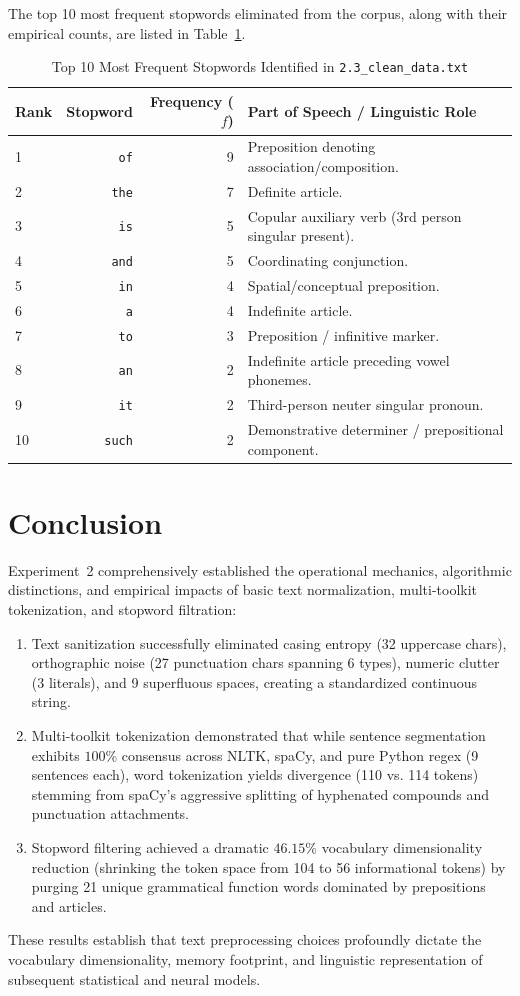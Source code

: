 The top 10 most frequent stopwords eliminated from the corpus, along with their empirical counts, are listed in Table~\ref{tab:exp2_top_stopwords}.
\begin{table}[H]
\centering
\small
\caption{Top 10 Most Frequent Stopwords Identified in \texttt{2.3\_clean\_data.txt}}
\label{tab:exp2_top_stopwords}
\begin{tabular}{lrrp{6.5cm}}
\toprule
\textbf{Rank} & \textbf{Stopword} & \textbf{Frequency ($f$)} & \textbf{Part of Speech / Linguistic Role} \\
\midrule
1 & \texttt{of} & 9 & Preposition denoting association/composition. \\
2 & \texttt{the} & 7 & Definite article. \\
3 & \texttt{is} & 5 & Copular auxiliary verb (3rd person singular present). \\
4 & \texttt{and} & 5 & Coordinating conjunction. \\
5 & \texttt{in} & 4 & Spatial/conceptual preposition. \\
6 & \texttt{a} & 4 & Indefinite article. \\
7 & \texttt{to} & 3 & Preposition / infinitive marker. \\
8 & \texttt{an} & 2 & Indefinite article preceding vowel phonemes. \\
9 & \texttt{it} & 2 & Third-person neuter singular pronoun. \\
10 & \texttt{such} & 2 & Demonstrative determiner / prepositional component. \\
\bottomrule
\end{tabular}
\end{table}

\section{Conclusion}
Experiment~2 comprehensively established the operational mechanics, algorithmic distinctions, and empirical impacts of basic text normalization, multi-toolkit tokenization, and stopword filtration:
\begin{enumerate}
    \item Text sanitization successfully eliminated casing entropy (32 uppercase chars), orthographic noise (27 punctuation chars spanning 6 types), numeric clutter (3 literals), and 9 superfluous spaces, creating a standardized continuous string.
    \item Multi-toolkit tokenization demonstrated that while sentence segmentation exhibits $100\%$ consensus across NLTK, spaCy, and pure Python regex (9 sentences each), word tokenization yields divergence (110 vs. 114 tokens) stemming from spaCy's aggressive splitting of hyphenated compounds and punctuation attachments.
    \item Stopword filtering achieved a dramatic $46.15\%$ vocabulary dimensionality reduction (shrinking the token space from 104 to 56 informational tokens) by purging 21 unique grammatical function words dominated by prepositions and articles.
\end{enumerate}
These results establish that text preprocessing choices profoundly dictate the vocabulary dimensionality, memory footprint, and linguistic representation of subsequent statistical and neural models.
